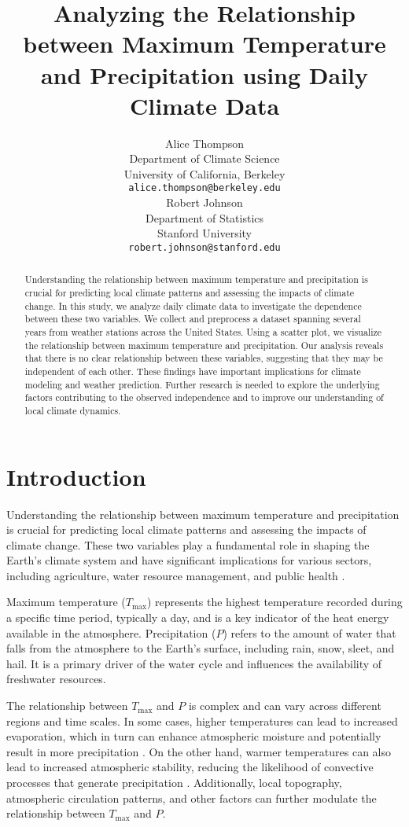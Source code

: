 \documentclass{article}
\title{Analyzing the Relationship between Maximum Temperature and Precipitation using Daily Climate Data}
\author{
  Alice Thompson \\
  Department of Climate Science\\
  University of California, Berkeley\\
  \texttt{alice.thompson@berkeley.edu} \\
  \And
  Robert Johnson \\
  Department of Statistics\\
  Stanford University\\
  \texttt{robert.johnson@stanford.edu} \\
}
\begin{document}
\maketitle

\begin{abstract}
Understanding the relationship between maximum temperature and precipitation is crucial for predicting local climate patterns and assessing the impacts of climate change. In this study, we analyze daily climate data to investigate the dependence between these two variables. We collect and preprocess a dataset spanning several years from weather stations across the United States. Using a scatter plot, we visualize the relationship between maximum temperature and precipitation. Our analysis reveals that there is no clear relationship between these variables, suggesting that they may be independent of each other. These findings have important implications for climate modeling and weather prediction. Further research is needed to explore the underlying factors contributing to the observed independence and to improve our understanding of local climate dynamics.
\end{abstract}

\section{Introduction}

Understanding the relationship between maximum temperature and precipitation is crucial for predicting local climate patterns and assessing the impacts of climate change. These two variables play a fundamental role in shaping the Earth's climate system and have significant implications for various sectors, including agriculture, water resource management, and public health \cite{IPCC2013, Lobell2011, Sheffield2012}. 

Maximum temperature ($T_{\text{max}}$) represents the highest temperature recorded during a specific time period, typically a day, and is a key indicator of the heat energy available in the atmosphere. Precipitation ($P$) refers to the amount of water that falls from the atmosphere to the Earth's surface, including rain, snow, sleet, and hail. It is a primary driver of the water cycle and influences the availability of freshwater resources.

The relationship between $T_{\text{max}}$ and $P$ is complex and can vary across different regions and time scales. In some cases, higher temperatures can lead to increased evaporation, which in turn can enhance atmospheric moisture and potentially result in more precipitation \cite{Held2006}. On the other hand, warmer temperatures can also lead to increased atmospheric stability, reducing the likelihood of convective processes that generate precipitation \cite{Allen2002}. Additionally, local topography, atmospheric circulation patterns, and other factors can further modulate the relationship between $T_{\text{max}}$ and $P$.
\end{document}
